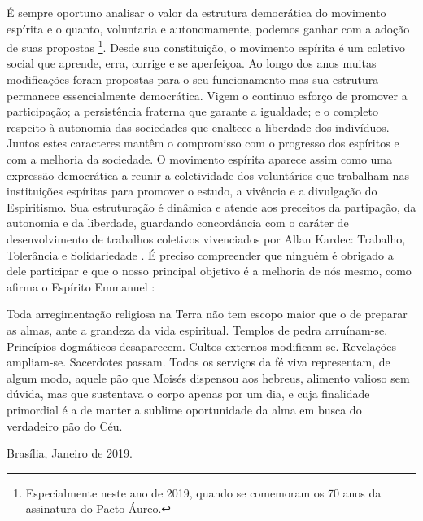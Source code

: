 É sempre oportuno analisar o valor da estrutura democrática do movimento espírita e o quanto, voluntaria e autonomamente, podemos ganhar com a adoção de suas propostas \footnote{Especialmente neste ano de 2019, quando se comemoram os 70 anos da assinatura do Pacto Áureo.}. Desde sua constituição, o movimento espírita é um coletivo social que aprende, erra, corrige e se aperfeiçoa. Ao longo dos anos muitas modificações foram propostas para o seu funcionamento mas sua estrutura permanece essencialmente democrática. Vigem o continuo esforço de promover a participação; a persistência fraterna que garante a igualdade; e o completo respeito à autonomia das sociedades que enaltece a liberdade dos indivíduos. Juntos estes caracteres mantêm o compromisso com o progresso dos espíritos e com a melhoria da sociedade. O movimento espírita aparece assim como uma expressão democrática a reunir a coletividade dos voluntários que trabalham nas instituições espíritas para promover o estudo, a vivência e a divulgação do Espiritismo. Sua estruturação é dinâmica e atende aos preceitos da partipação, da autonomia e da liberdade, guardando concordância com o caráter de desenvolvimento de trabalhos coletivos vivenciados por Allan Kardec: Trabalho, Tolerância e Solidariedade \cite[p. 14]{Kardec1890}. É preciso compreender que ninguém é obrigado a dele participar e que o nosso principal objetivo é a melhoria de nós mesmo, como afirma o Espírito Emmanuel \cite[Edição Kindle: comentário a João 6:32]{emmEvJoao}:

\begin{citacao}
Toda arregimentação religiosa na Terra não tem escopo maior que o de preparar as almas, ante a grandeza da vida espiritual.
Templos de pedra arruínam-se.
Princípios dogmáticos desaparecem.
Cultos externos modificam-se.
Revelações ampliam-se.
Sacerdotes passam.
Todos os serviços da fé viva representam, de algum modo, aquele pão que Moisés dispensou aos hebreus, alimento valioso sem dúvida, mas que sustentava o corpo apenas por um dia, e cuja finalidade primordial é a de manter a sublime oportunidade da alma em busca do verdadeiro pão do Céu.
\end{citacao}
 

\vspace{1,2cm}
\hspace{\fill} Brasília, Janeiro de 2019.
